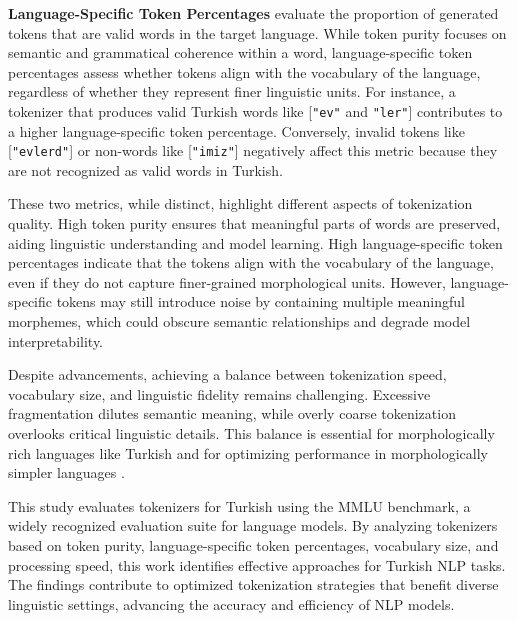 \textbf{Language-Specific Token Percentages} evaluate the proportion of generated tokens that are valid words in the target language. While token purity focuses on semantic and grammatical coherence within a word, language-specific token percentages assess whether tokens align with the vocabulary of the language, regardless of whether they represent finer linguistic units. For instance, a tokenizer that produces valid Turkish words like [\texttt{"ev"} and \texttt{"ler"}] contributes to a higher language-specific token percentage. Conversely, invalid tokens like [\texttt{"evlerd"}] or non-words like [\texttt{"imiz"}] negatively affect this metric because they are not recognized as valid words in Turkish.

These two metrics, while distinct, highlight different aspects of tokenization quality. High token purity ensures that meaningful parts of words are preserved, aiding linguistic understanding and model learning. High language-specific token percentages indicate that the tokens align with the vocabulary of the language, even if they do not capture finer-grained morphological units. However, language-specific tokens may still introduce noise by containing multiple meaningful morphemes, which could obscure semantic relationships and degrade model interpretability.

Despite advancements, achieving a balance between tokenization speed, vocabulary size, and linguistic fidelity remains challenging. Excessive fragmentation dilutes semantic meaning, while overly coarse tokenization overlooks critical linguistic details. This balance is essential for morphologically rich languages like Turkish and for optimizing performance in morphologically simpler languages \cite{neubeck_so_2024}.

This study evaluates tokenizers for Turkish using the MMLU benchmark, a widely recognized evaluation suite for language models. By analyzing tokenizers based on token purity, language-specific token percentages, vocabulary size, and processing speed, this work identifies effective approaches for Turkish NLP tasks. The findings contribute to optimized tokenization strategies that benefit diverse linguistic settings, advancing the accuracy and efficiency of NLP models.
